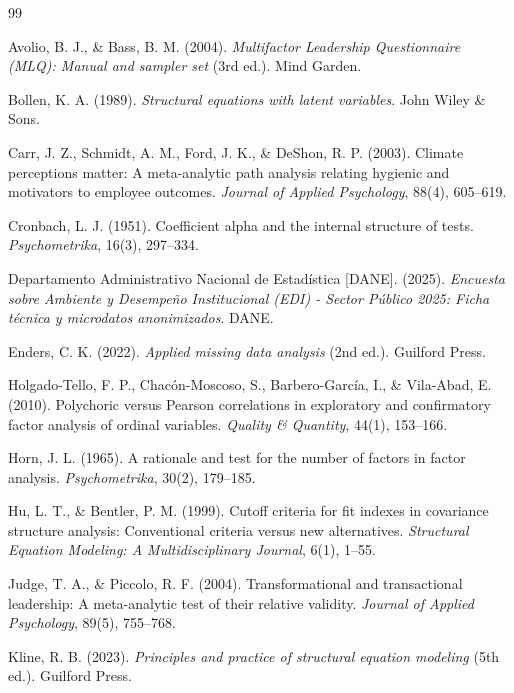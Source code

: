 \documentclass[11pt, a4paper]{article} %
\begin{document}
\begin{thebibliography}{99}
\small 
\setlength{\itemsep}{0pt} 

 Avolio, B. J., \& Bass, B. M. (2004). \textit{Multifactor Leadership Questionnaire (MLQ): Manual and sampler set} (3rd ed.). Mind Garden.

 Bollen, K. A. (1989). \textit{Structural equations with latent variables}. John Wiley \& Sons.

 Carr, J. Z., Schmidt, A. M., Ford, J. K., \& DeShon, R. P. (2003). Climate perceptions matter: A meta-analytic path analysis relating hygienic and motivators to employee outcomes. \textit{Journal of Applied Psychology}, 88(4), 605--619.

 Cronbach, L. J. (1951). Coefficient alpha and the internal structure of tests. \textit{Psychometrika}, 16(3), 297--334.

 Departamento Administrativo Nacional de Estadística [DANE]. (2025). \textit{Encuesta sobre Ambiente y Desempeño Institucional (EDI) - Sector Público 2025: Ficha técnica y microdatos anonimizados}. DANE.

 Enders, C. K. (2022). \textit{Applied missing data analysis} (2nd ed.). Guilford Press.

 Holgado-Tello, F. P., Chacón-Moscoso, S., Barbero-García, I., \& Vila-Abad, E. (2010). Polychoric versus Pearson correlations in exploratory and confirmatory factor analysis of ordinal variables. \textit{Quality \& Quantity}, 44(1), 153--166.

 Horn, J. L. (1965). A rationale and test for the number of factors in factor analysis. \textit{Psychometrika}, 30(2), 179--185.

 Hu, L. T., \& Bentler, P. M. (1999). Cutoff criteria for fit indexes in covariance structure analysis: Conventional criteria versus new alternatives. \textit{Structural Equation Modeling: A Multidisciplinary Journal}, 6(1), 1--55.

 Judge, T. A., \& Piccolo, R. F. (2004). Transformational and transactional leadership: A meta-analytic test of their relative validity. \textit{Journal of Applied Psychology}, 89(5), 755--768.

 Kline, R. B. (2023). \textit{Principles and practice of structural equation modeling} (5th ed.). Guilford Press.


\end{thebibliography}
\end{document}
